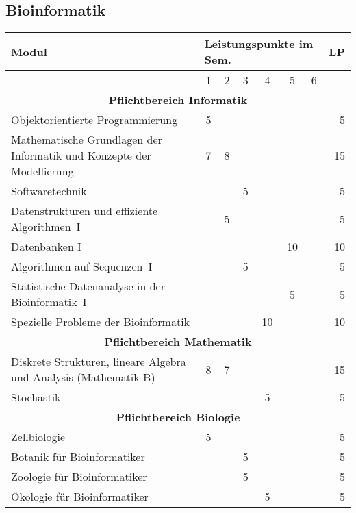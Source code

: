 
\subsection{Bioinformatik}
\label{studiengang_bioinformatik}

\begin{table}[tbp]
\begin{small}
\begin{tabularx}{\textwidth}{|X||c|c|c|c|c|c||r|}
    \hline
    \textbf{Modul}&\multicolumn{6}{l||}{\textbf{Leistungspunkte im Sem.}}&\textbf{LP}\\\hline
    &1&2&3&4&5&6&\\\hline\hline
    \multicolumn{8}{|c|}{\textbf{Pflichtbereich Informatik}}\\\hline
    Objektorientierte Programmierung&5&&&&&&5\\\hline
    Mathematische Grundlagen der Informatik und Konzepte der Modellierung&7&8&&&&&15\\\hline
    Softwaretechnik&&&5&&&&5\\\hline
    Datenstrukturen und effiziente Algorithmen~I&&5&&&&&5\\\hline
    Datenbanken I&&&&&10&&10\\\hline
    Algorithmen auf Sequenzen~I&&&5&&&&5\\\hline
    Statistische Datenanalyse in der Bioinformatik~I&&&&&5&&5\\\hline
    Spezielle Probleme der Bioinformatik &&&&10&&&10\\\hline\hline
    \multicolumn{8}{|c|}{\textbf{Pflichtbereich Mathematik}}\\\hline
    Diskrete Strukturen, lineare Algebra und Analysis (Mathematik B)&8&7&&&&&15\\\hline
    Stochastik&&&&5&&&5\\\hline\hline
    \multicolumn{8}{|c|}{\textbf{Pflichtbereich Biologie}}\\\hline
    Zellbiologie&5&&&&&&5\\\hline
    Botanik für Bioinformatiker&&&5&&&&5\\\hline
    Zoologie für Bioinformatiker&&&5&&&&5\\\hline
    Ökologie für Bioinformatiker&&&&5&&&5\\\hline

\end{tabularx}
\end{small}
\end{table}
